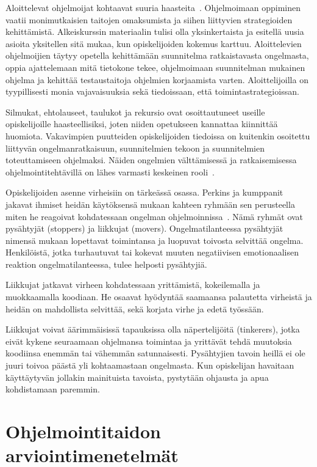 \documentclass[finnish]{../tktltiki2}
\theoremstyle{definition}
\theoremstyle{remark}
\begin{document}
Aloittelevat ohjelmoijat kohtaavat suuria haasteita~\cite{RRR03}. Ohjelmoimaan oppiminen vaatii monimutkaisien taitojen omaksumista ja siihen liittyvien strategioiden kehittämistä. Alkeiskurssin materiaalin tulisi olla yksinkertaista ja esitellä uusia asioita yksitellen sitä mukaa, kun opiskelijoiden kokemus karttuu. Aloittelevien ohjelmoijien täytyy opetella kehittämään suunnitelma ratkaistavasta ongelmasta, oppia ajattelemaan mitä tietokone tekee, ohjelmoimaan suunnitelman mukainen ohjelma ja kehittää testaustaitoja ohjelmien korjaamista varten. Aloittelijoilla on tyypillisesti monia vajavaisuuksia sekä tiedoissaan, että toimintastrategioissan.

Silmukat, ehtolauseet, taulukot ja rekursio ovat osoittautuneet useille opiskelijoille haasteellisiksi, joten niiden opetukseen kannattaa kiinnittää huomiota. Vakavimpien puutteiden opiskelijoiden tiedoissa on kuitenkin osoitettu liittyvän ongelmanratkaisuun, suunnitelmien tekoon ja suunnitelmien toteuttamiseen ohjelmaksi. Näiden ongelmien välttämisessä ja ratkaisemisessa ohjelmointitehtävillä on lähes varmasti keskeinen rooli~\cite{RRR03}.

Opiskelijoiden asenne virheisiin on tärkeässä osassa. Perkins ja kumppanit jakavat ihmiset heidän käytöksensä mukaan kahteen ryhmään sen perusteella miten he reagoivat kohdatessaan ongelman ohjelmoinnissa~\cite{PHHMS86,RRR03}. Nämä ryhmät ovat pysähtyjät (stoppers) ja liikkujat (movers). Ongelmatilanteessa pysähtyjät nimensä mukaan lopettavat toimintansa ja luopuvat toivosta selvittää ongelma. Henkilöistä, jotka turhautuvat tai kokevat muuten negatiivisen emotionaalisen reaktion ongelmatilanteessa, tulee helposti pysähtyjiä.

Liikkujat jatkavat virheen kohdatessaan yrittämistä, kokeilemalla ja muokkaamalla koodiaan. He osaavat hyödyntää saamaansa palautetta virheistä ja heidän on mahdollista selvittää, sekä korjata virhe ja edetä työssään.

Liikkujat voivat äärimmäisissä tapauksissa olla näpertelijöitä (tinkerers), jotka eivät kykene seuraamaan ohjelmansa toimintaa ja yrittävät tehdä muutoksia koodiinsa enemmän tai vähemmän satunnaisesti. Pysähtyjien tavoin heillä ei ole juuri toivoa päästä yli kohtaamastaan ongelmasta. Kun opiskelijan havaitaan käyttäytyvän jollakin mainituista tavoista, pystytään ohjausta ja apua kohdistamaan paremmin.

\section{Ohjelmointitaidon arviointimenetelmät}
\end{document}
